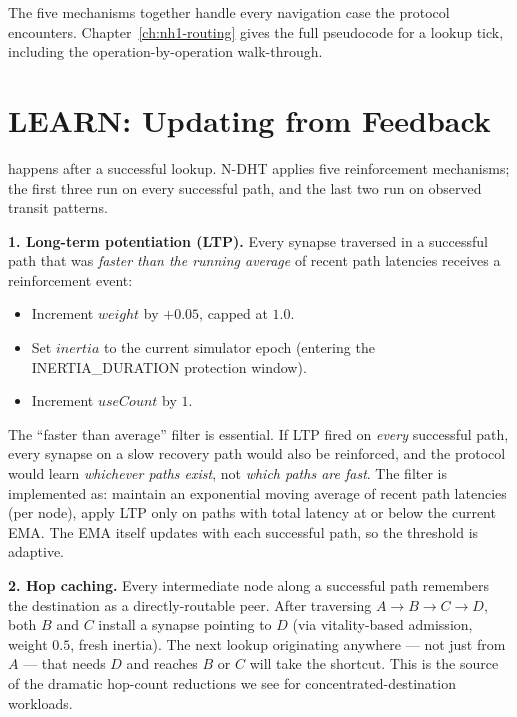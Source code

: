 \documentclass[twoside,nobib]{tufte-book}
\newcommand{\NDHT}{N-DHT\xspace}
\begin{document}
The five mechanisms together handle every navigation case the
protocol encounters. Chapter~\ref{ch:nh1-routing} gives the full
pseudocode for a lookup tick, including the operation-by-operation
walk-through.

\section{LEARN: Updating from Feedback}
\label{sec:learn}

 happens after a successful lookup. \NDHT
applies five reinforcement mechanisms; the first three run on
every successful path, and the last two run on observed transit
patterns.

\textbf{1. Long-term potentiation (LTP).} Every synapse traversed
in a successful path that was \emph{faster than the running
average} of recent path latencies receives a reinforcement event:

\begin{itemize}\setlength\itemsep{0.15em}
  \item Increment $\mathit{weight}$ by $+0.05$, capped at $1.0$.
  \item Set $\mathit{inertia}$ to the current simulator epoch
    (entering the \textsc{INERTIA\_DURATION} protection window).
  \item Increment $\mathit{useCount}$ by $1$.
\end{itemize}

The ``faster than average'' filter is essential. If LTP fired on
\emph{every} successful path, every synapse on a slow recovery
path would also be reinforced, and the protocol would learn
\emph{whichever paths exist}, not \emph{which paths are fast}. The
filter is implemented as: maintain an exponential moving average
of recent path latencies (per node), apply LTP only on paths with
total latency at or below the current EMA. The EMA itself updates
with each successful path, so the threshold is adaptive.

\textbf{2. Hop caching.} Every intermediate node along a successful
path remembers the destination as a directly-routable peer. After
traversing $A \to B \to C \to D$, both $B$ and $C$ install a
synapse pointing to $D$ (via vitality-based admission, weight
$0.5$, fresh inertia). The next lookup originating anywhere ---
not just from $A$ --- that needs $D$ and reaches $B$ or $C$ will
take the shortcut. This is the source of the dramatic
hop-count reductions we see for concentrated-destination workloads.
\end{document}
